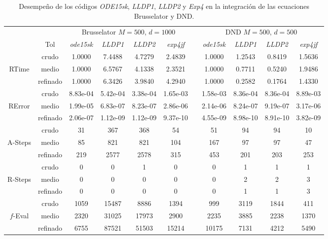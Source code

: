 \begin{table}
	\caption{Desempeño de los códigos \emph{ODE15sk}, \emph{LLDP1}, \emph{LLDP2} y \emph{Exp4} en la integración de las ecuaciones Brusselator y DND.}
	\label{tab:brussdnd}
	\begin{adjustbox}{width=0.95\columnwidth,center}
		\begin{tabular}{ccccccccccc}
			\hline
			&  & \multicolumn{4}{c}{Brusselator $M=500$, $d=1000$} &  & \multicolumn{4}{c}{DND $M=500$, $d=500$} \\
			\cline{3-6}\cline{8-11} & Tol & \emph{ode15sk} & \emph{LLDP1} & \emph{LLDP2} & \emph{exp4jf} &  & \emph{ode15sk} & \emph{LLDP1} & \emph{LLDP2} & \emph{exp4jf} \\
			\hline
			& crudo & 1.0000 & 7.4488 & 4.7279 & 2.4839 &  & 1.0000 & 1.2543 & 0.8419 & 1.5636 \\
			RTime & medio & 1.0000 & 6.5767 & 4.1338 & 2.3521 &  & 1.0000 & 0.7711 & 0.5240 & 1.9486 \\
			& refinado & 1.0000 & 6.3426 & 3.9840 & 4.2940 &  & 1.0000 & 0.2582 & 0.1764 & 1.4330 \\
			\hline
			& crudo & 8.83e-04 & 5.42e-04 & 3.38e-04 & 1.65e-03 &  & 1.58e-03 & 8.36e-04 & 8.36e-04 & 8.89e-03 \\
			RError & medio & 1.99e-05 & 6.83e-07 & 8.23e-07 & 2.86e-06 &  & 2.14e-06 & 8.24e-07 & 9.19e-07 & 3.17e-06 \\
			& refinado & 2.06e-07 & 1.12e-09 & 1.12e-09 & 9.37e-10 &  & 4.55e-09 & 8.98e-10 & 8.91e-10 & 3.82e-09 \\
			\hline
			& crudo & 31 & 367 & 368 & 54 &  & 51 & 94 & 94 & 10 \\
			A-Steps & medio & 85 & 821 & 821 & 104 &  & 167 & 97 & 97 & 47 \\
			& refinado & 219 & 2577 & 2578 & 315 &  & 453 & 201 & 203 & 253 \\
			\hline
			& crudo & 0 & 0 & 1 & 0 &  & 0 & 1 & 1 & 1 \\
			R-Steps & medio & 0 & 0 & 0 & 0 &  & 0 & 2 & 2 & 3 \\
			& refinado & 0 & 0 & 0 & 0 &  & 0 & 1 & 1 & 3 \\
			\hline
			& crudo & 1059 & 15487 & 8886 & 1394 &  & 999 & 3119 & 1844 & 411 \\
			$f$-Eval & medio & 2320 & 31025 & 17973 & 2900 &  & 2235 & 3885 & 2238 & 1370 \\
			& refinado & 6755 & 87521 & 51503 & 15214 &  & 10175 & 7131 & 4212 & 5490 \\
			\hline

\end{tabular}
\end{adjustbox}
\end{table}

